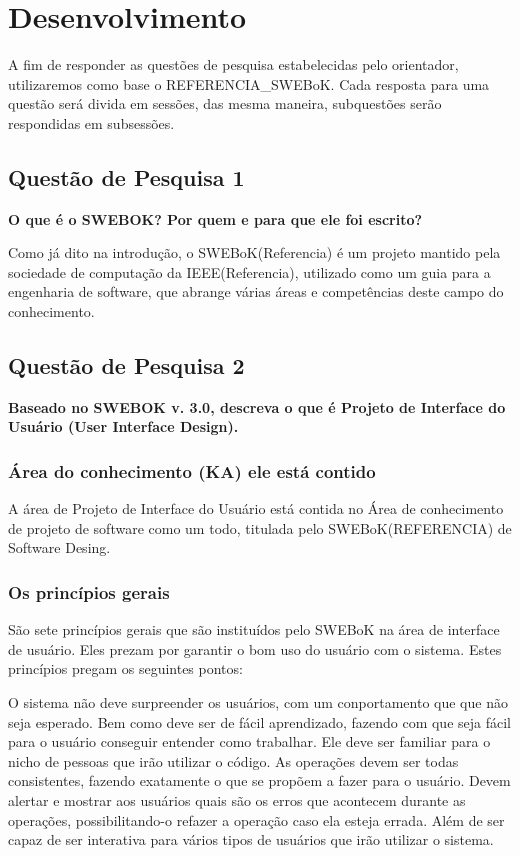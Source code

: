 \chapter[Desenvolvimento ]{Desenvolvimento}

A fim de responder as questões de pesquisa estabelecidas pelo orientador,
utilizaremos como base o REFERENCIA\_SWEBoK. Cada resposta para uma questão
será divida em sessões, das mesma maneira, subquestões serão respondidas em
subsessões.

\section[Questão de Pesquisa 1]{Questão de Pesquisa 1}
\textbf{O que é o SWEBOK? Por quem e para que ele foi escrito?}


Como já dito na introdução, o SWEBoK(Referencia) é um projeto mantido pela
sociedade de computação da IEEE(Referencia), utilizado como um guia para a
engenharia de software, que abrange várias áreas e competências deste campo do
conhecimento.

\section[Questão de Pesquisa 2]{Questão de Pesquisa 2}
\textbf{Baseado no SWEBOK v. 3.0, descreva o que é Projeto de Interface do
Usuário (User Interface Design).}

\subsection[Área do conhecimento (KA) ele está contido]{Área do conhecimento (KA) ele está contido}

A área de Projeto de Interface do Usuário está contida no Área de conhecimento
de projeto de software como um todo, titulada pelo SWEBoK(REFERENCIA) de Software
Desing.

\subsection[Os princípios gerais]{Os princípios gerais}
São sete princípios gerais que são instituídos pelo SWEBoK na área de interface
de usuário. Eles prezam por garantir o bom uso do usuário com o sistema. Estes
princípios pregam os seguintes pontos:

O sistema não deve surpreender os usuários, com um conportamento que que não seja
esperado. Bem como deve ser de fácil aprendizado, fazendo com que seja fácil para
o usuário conseguir entender como trabalhar. Ele deve ser familiar para o nicho
de pessoas que irão utilizar o código. As operações devem ser todas consistentes,
fazendo exatamente o que se propõem a fazer para o usuário. Devem alertar e mostrar
aos usuários quais são os erros que acontecem durante as operações, possibilitando-o
refazer a operação caso ela esteja errada. Além de ser capaz de ser interativa
para vários tipos de usuários que irão utilizar o sistema.

